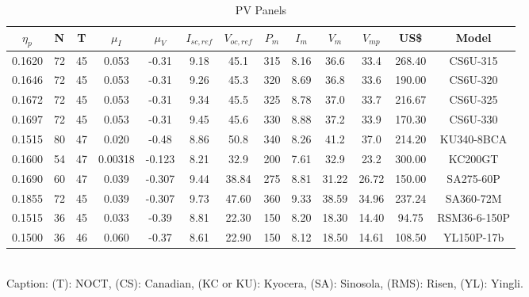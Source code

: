 \documentclass[journal,onecolumn]{IEEEtran}
\begin{document}
\begin{table}[h]
\renewcommand{\arraystretch}{1.3}
\caption{PV Panels}\label{tab:panels}
\centering
\begin{scriptsize}
\begin{tabular}{c|c|c|c|c|c|c|c|c|c|c|c|c}
\hline
\hline
$\eta_{p}$ & N & T & $\mu_{I}$ & $\mu_{V}$ & $I_{sc,ref}$ & $V_{oc,ref}$ & $P_{m}$ & $I_{m}$ & $V_{m}$ & $V_{mp}$ & US\$ & Model \\
\hline
\hline
0.1620 & 72 & 45 & 0.053 & -0.31 & 9.18 & 45.1 & 315 & 8.16 & 36.6 & 33.4 & 268.40 & CS6U-315 \\
\hline
0.1646 & 72 & 45 & 0.053 & -0.31 & 9.26 & 45.3 & 320 & 8.69 & 36.8 & 33.6 & 190.00 &  CS6U-320 \\
\hline
0.1672 & 72 & 45 & 0.053 & -0.31 & 9.34 & 45.5 & 325 & 8.78 & 37.0 & 33.7 & 216.67 & CS6U-325 \\
\hline
0.1697 & 72 & 45 & 0.053 & -0.31 & 9.45 & 45.6 & 330 & 8.88 & 37.2 & 33.9 & 170.30 & CS6U-330 \\
\hline
0.1515 & 80 & 47 & 0.020 & -0.48 & 8.86 & 50.8 & 340 & 8.26 & 41.2 & 37.0 & 214.20 & KU340-8BCA \\
\hline
0.1600 & 54 & 47 & 0.00318 & -0.123 & 8.21 & 32.9 & 200 & 7.61 & 32.9 & 23.2 & 300.00 & KC200GT \\
\hline
0.1690 & 60 & 47 & 0.039 & -0.307 & 9.44 & 38.84 & 275 & 8.81 & 31.22 & 26.72 & 150.00 & SA275-60P \\
\hline
0.1855 & 72 & 45 & 0.039 & -0.307 & 9.73 & 47.60 & 360 & 9.33 & 38.59 & 34.96 & 237.24 & SA360-72M \\
\hline
0.1515 & 36 & 45 & 0.033 & -0.39 & 8.81 & 22.30 & 150 & 8.20 & 18.30 & 14.40 & 94.75 & RSM36-6-150P \\
\hline
0.1500 & 36 & 46 & 0.060 & -0.37 & 8.61 & 22.90 & 150 & 8.12 & 18.50 & 14.61 & 108.50 & YL150P-17b \\
\hline
\hline
\end{tabular}
\newline
\\Caption: (T): NOCT, (CS): Canadian, (KC or KU): Kyocera, (SA): Sinosola, (RMS): Risen, (YL): Yingli.
\end{scriptsize}
\end{table}
\end{document}
